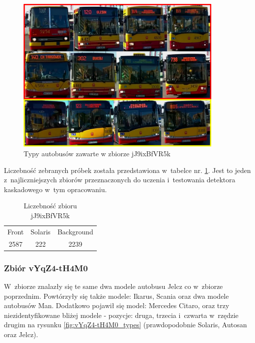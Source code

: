 \begin{figure}[!h]
    \centering
    \includegraphics[width=0.9\textwidth]{img/exp_trainig_data_jJ9}
    \caption{Typy autobusów zawarte w zbiorze jJ9ixBfVR5k}
    \label{fig:jJ9ixBfVR5k_types}
\end{figure}

Liczebność zebranych próbek została przedstawiona w~tabelce nr. 
\ref{tab:jJ9ixBfVR5k_count}. Jest to jeden z~najliczniejszych zbiorów
przeznaczonych do uczenia i~testowania detektora kaskadowego w~tym 
opracowaniu.

\begin{table}[!h]
    \centering
    \begin{tabular}{c|c|c}
        Front   & Solaris   & Background \\
        2587    & 222       & 2239
    \end{tabular}
    \caption{Liczebność zbioru jJ9ixBfVR5k}
    \label{tab:jJ9ixBfVR5k_count}
\end{table}

\newpage

\subsubsection{Zbiór vYqZ4-tH4M0}

W~zbiorze znalazły się te same dwa modele autobusu Jelcz co w~zbiorze
poprzednim. Powtórzyły się także modele: Ikarus, Scania oraz dwa modele
autobusów Man. Dodatkowo pojawił się model: Mercedes Citaro, oraz trzy 
niezidentyfikowane bliżej modele - pozycje: druga, trzecia i~czwarta 
w~rzędzie drugim na rysunku \ref{fig:vYqZ4-tH4M0_types} 
(prawdopodobnie Solaris, Autosan oraz Jelcz).

